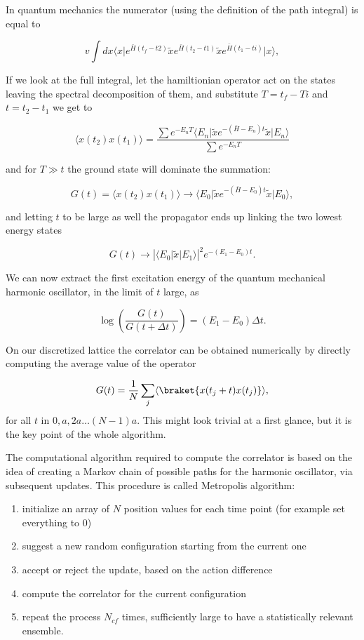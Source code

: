 \documentclass[%
oneside,                 %
final,                   %
10pt]{article}
\begin{document}
In quantum mechanics the numerator (using the definition of the path integral) is equal to

\[	
v	\int dx \langle x\vert  e^{\bar{H}(t_f-t2)} \tilde{x} e^{\bar{H}(t_2-t1)} \tilde{x} e^{\bar{H}(t_1-ti)} \vert x\rangle,
\]

If we look at the full integral, let the hamiltionian operator act on
the states leaving the spectral decomposition of them, and substitute
$T = t_f-Ti$ and $t = t_2 - t_1$ we get to

\[
	\langle x(t_2)x(t_1) \rangle = \frac{\sum e^{-E_n T} \langle E_n\vert \tilde{x} e^{-(\bar{H}-E_n)t}  \tilde{x}\vert E_n\rangle }{\sum e^{-E_n T }}
\]

and for $T \gg t$ the ground state will dominate the summation:

\[
	G(t) = \langle x(t_2)x(t_1)\rangle \rightarrow  \langle E_0\vert \tilde{x} e^{-(\bar{H}-E_0)t}  \tilde{x}\vert E_0\rangle,
\]

and letting $t$ to be large as well the propagator ends up linking the two lowest energy states

\[
	G(t) \rightarrow  |\langle E_0\vert \tilde{x} \vert E_1\rangle|^2e^{-(E_1-E_0)t}.
\]

We can now extract the first excitation energy of the quantum mechanical harmonic oscillator, in the limit of $t$ large, as

\[
	\log\left( \frac{G(t)}{G(t+\Delta t)}\right) = (E_1 - E_0)\Delta t.
\]

On our discretized lattice the correlator can be obtained numerically by directly computing the average value of the operator

\[
	G(t) = \frac{1}{N}\sum_j\langle\braket{x(t_j+t)x(t_j)}\rangle,
\]
for all $t$ in $0, a, 2a\dots (N-1)a$. This might look trivial at a first glance, but it is the key point of the whole algorithm.

The computational algorithm required to compute the correlator is
based on the idea of creating a Markov chain of possible paths for the
harmonic oscillator, via subsequent updates. This procedure is called
Metropolis algorithm:

\begin{enumerate}
\item initialize an array of $N$ position values for each time point (for example set everything to 0)

\item suggest a new random configuration starting from the current one

\item accept or reject the update, based on the action difference

\item compute the correlator for the current configuration

\item repeat the process $N_{cf}$ times, sufficiently large to have a statistically relevant ensemble.
\end{enumerate}
\end{document}
